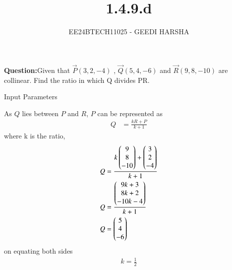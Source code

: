 \documentclass[journal]{IEEEtran}
\begin{document}

\vspace{3cm}
\title{1.4.9.d}
\author{EE24BTECH11025 - GEEDI HARSHA}
{\let\newpage\relax\maketitle}

\renewcommand{\thefigure}{\theenumi}
\renewcommand{\thetable}{\theenumi}
\setlength{\intextsep}{10pt} %


\renewcommand{\thetable}{\theenumi}

\textbf{Question:}Given that $\vec{P}(3,2,-4)$ , $\vec{Q}(5,4,-6)$ and $\vec{R}(9,8,-10)$ are collinear. Find the ratio in which Q divides PR.\\
\begin{table}[h!]    
  			\centering
  			
  			\caption{Input Parameters}
  			\label{tab1.4.9.d}
		\end{table}

	

 
		\solution As $Q$ lies between $P$ and $R$, $P$ can be represented as\\ 
		\begin{align}
			Q &=\frac{kR+P}{k+1}
		\end{align}	
			where k is the ratio,\\
		\begin{align}
			Q &=\frac{k\begin{pmatrix}9\\8\\-10\end{pmatrix}+\begin{pmatrix}3\\2\\-4\end{pmatrix}}{k+1} \\
			Q &=\frac{\begin{pmatrix}9k+3\\8k+2\\-10k-4\end{pmatrix}}{k+1} \\
			Q &=\begin{pmatrix}5\\4\\-6\end{pmatrix}
		\end{align}
			on equating both sides \\
		\begin{align}
			k=\frac{1}{2}
                \end{align}		
\end{document}
